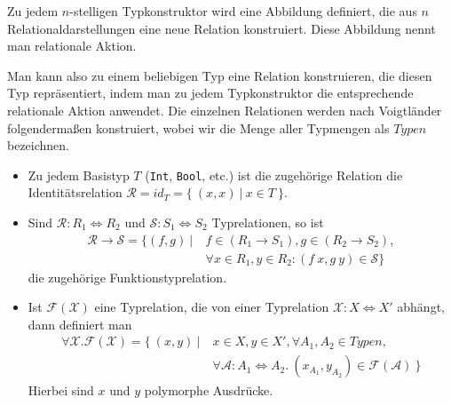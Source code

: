 \begin{mydef}
Zu jedem $n$-stelligen Typkonstruktor wird eine Abbildung definiert, die aus $n$ Relationaldarstellungen eine neue Relation konstruiert.
Diese Abbildung nennt man relationale Aktion.
\end{mydef}




Man kann also zu einem beliebigen Typ eine Relation konstruieren, die diesen Typ repräsentiert, indem man zu jedem Typkonstruktor
die entsprechende relationale Aktion anwendet. Die einzelnen Relationen werden nach Voigtländer \cite{voigtlander} folgendermaßen konstruiert, wobei wir die Menge aller Typmengen als $Typen$ bezeichnen.

\begin{itemize}
\item Zu jedem Basistyp $T$ (\texttt{Int}, \texttt{Bool}, etc.) ist die zugehörige Relation die Identitätsrelation $\mathcal{R} = id_{T} = \{~(x, x)~|~x \in T~\}$.
\item Sind $\mathcal{R} : R_1 \Leftrightarrow R_2$ und $\mathcal{S} : S_1 \Leftrightarrow S_2$ Typrelationen, so ist
\begin{align*}
\mathcal{R} \rightarrow \mathcal{S} = \{ (f, g) ~|~ & f \in (R_1 \rightarrow S_1), g \in (R_2 \rightarrow S_2),\\
& \forall x \in R_1, y \in R_2: (f\ x, g\ y) \in \mathcal{S} \}
\end{align*}
die zugehörige Funktionstyprelation.
\item Ist $\mathcal{F}(\mathcal{X})$ eine Typrelation, die von einer Typrelation $\mathcal{X} : X \Leftrightarrow X'$ abhängt,
dann definiert man
\begin{align*}
\forall \mathcal{X} . \mathcal{F}(\mathcal{X}) = \{~(x, y)~|~& x \in X, y \in X', \forall A_1, A_2 \in Typen,\\
&\forall \mathcal{A} : A_1 \Leftrightarrow A_2.~ (x_{A_1}, y_{A_2}) \in \mathcal{F}(\mathcal{A})~\}
\end{align*}
Hierbei sind $x$ und $y$ polymorphe Ausdrücke.
\end{itemize}

